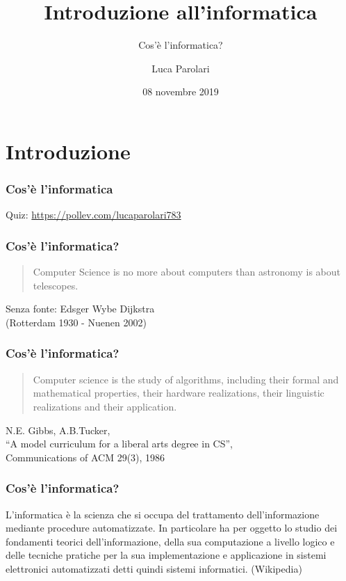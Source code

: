 \documentclass[11pt]{beamer}
\title[Introduzione]{Introduzione all'informatica}
\subtitle{Cos'è l'informatica?}
\author{Luca Parolari}
\date{08 novembre 2019}
\begin{document}
    \begin{frame}[plain]
        \maketitle
    \end{frame}

    \section{Introduzione}

    \begin{frame}
        \frametitle{Cos'è l'informatica}

        \centering
        Quiz: \href{https://pollev.com/lucaparolari783}{https://pollev.com/lucaparolari783}
    \end{frame}

    \begin{frame}
        \frametitle{Cos'è l'informatica?}

        \blockquote{Computer Science is no more about computers than astronomy is about telescopes.}

        \begin{flushright}
            Senza fonte: Edsger Wybe Dijkstra\\
            (Rotterdam 1930 - Nuenen 2002)
        \end{flushright}
    \end{frame}

    \begin{frame}
        \frametitle{Cos'è l'informatica?}

        \blockquote{Computer science is the study of algorithms,    including their formal and mathematical properties, their hardware realizations, their linguistic realizations and their application.}

        \begin{flushright}
            N.E. Gibbs, A.B.Tucker,\\ ``A model curriculum for a liberal arts degree in CS'',\\ Communications of ACM 29(3), 1986
        \end{flushright}
    \end{frame}

    \begin{frame}
        \frametitle{Cos'è l'informatica?}

        L'informatica è la scienza che si occupa del trattamento dell'informazione mediante \alert{procedure automatizzate}. In particolare ha per oggetto lo studio dei fondamenti teorici dell'informazione, della sua computazione a livello logico e delle tecniche pratiche per la sua implementazione e applicazione in sistemi elettronici automatizzati detti quindi sistemi informatici. (Wikipedia)
    \end{frame}
\end{document}

